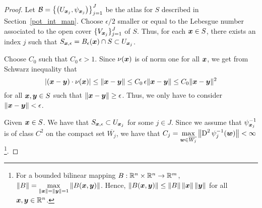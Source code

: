 \begin{proof}
Let $\displaystyle \mathcal{B} = \left\{ \left(U_{{\bm{x}}_j},
\psi_{{\bm{x}}_j}\right) \right \}_{j=1}^J$ be the atlas for
$S$ described in Section~\ref{pot_int_man}.
Choose $\epsilon/2$ smaller or equal to the Lebesgue number associated
to the open cover $\displaystyle \{ V_{{\bm{x}}_j}\}_{j=1}^J$ of $S$.  Thus,
for each ${\bm{x}} \in S$, there exists an index $j$ such that
$\displaystyle
S_{{\bm{x}},\epsilon} = B_{\epsilon}({\bm{x}}) \cap S \subset U_{{\bm{x}}_j}$.

Choose $C_0$ such that $C_0\,\epsilon > 1$.  Since
$\nu({\bm{x}})$ is of norm one for all ${\bm{x}}$, we get from
Schwarz inequality that
\[
\left| ({\bm{x}}-{\bm{y}}) \cdot \nu({\bm{x}}) \right|
\leq \|{\bm{x}}-{\bm{y}}\|
\leq C_0\,\epsilon \|{\bm{x}}-{\bm{y}}\|
\leq C_0 \|{\bm{x}}-{\bm{y}}\|^2
\]
for all ${\bm{x}}, {\bm{y}} \in S$ such that
$\|{\bm{x}}-{\bm{y}}\| \geq \epsilon$.
Thus, we only have to consider $\|{\bm{x}}-{\bm{y}}\| < \epsilon$.

Given ${\bm{x}} \in S$.  We have that
$\displaystyle S_{{\bm{x}},\epsilon} \subset U_{{\bm{x}}_j}$ for some $j \in J$.
Since we assume that
$\displaystyle \psi_{{\bm{x}}_j}^{-1}$ is of class $C^2$ on the compact set
$\displaystyle \overline{W_j}$, we
have that $\displaystyle C_j = \max_{{\bm{w}} \in \overline{W_j}}
\left\| \operatorname{D}^2 \psi_j^{-1}({\bm{w}}) \right\| < \infty$
\footnote{For a bounded bilinear mapping $B:\mathbb{R}^n \times \mathbb{R}^n \to \mathbb{R}^m$,
$\displaystyle \|B\| = \max_{\|{\bm{x}}\|= \|{\bm{y}}\|=1}
\|B({\bm{x}},{\bm{y}})\|$.
Hence, $\|B({\bm{x}},{\bm{y}})\| \leq \|B\| \, \|{\bm{x}}\|\, \|{\bm{y}}\|$
for all ${\bm{x}}, {\bm{y}} \in \mathbb{R}^n$.}.


\end{proof}
